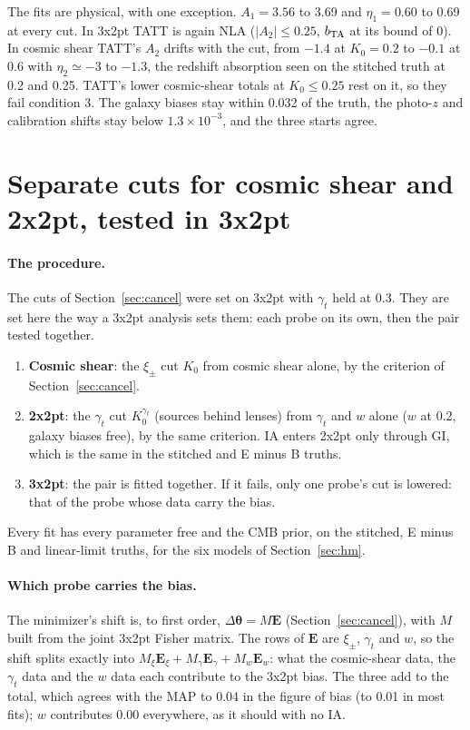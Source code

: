 \documentclass[11pt]{article}
\newcommand{\bvec}[1]{\boldsymbol{#1}}
\begin{document}
The fits are physical, with one exception. $A_1 = 3.56$ to 3.69 and $\eta_1
= 0.60$ to 0.69 at every cut. In 3x2pt TATT is again NLA ($|A_2| \le 0.25$,
$b_{\rm TA}$ at its bound of 0). In cosmic shear TATT's $A_2$ drifts with
the cut, from $-1.4$ at $K_0 = 0.2$ to $-0.1$ at 0.6 with $\eta_2 \simeq -3$
to $-1.3$, the redshift absorption seen on the stitched truth at 0.2 and
0.25. TATT's lower cosmic-shear totals at $K_0 \le 0.25$ rest on it, so they
fail condition 3. The galaxy biases stay within 0.032 of the truth, the
photo-$z$ and calibration shifts stay below $1.3\times10^{-3}$, and the three
starts agree.

\section{Separate cuts for cosmic shear and 2x2pt, tested in 3x2pt}
\label{sec:sepcuts}

\paragraph{The procedure.}
The cuts of Section~\ref{sec:cancel} were set on 3x2pt with $\gamma_t$ held
at 0.3. They are set here the way a 3x2pt analysis sets them: each probe on
its own, then the pair tested together.
\begin{enumerate}
  \item \textbf{Cosmic shear}: the $\xi_\pm$ cut $K_0$ from cosmic shear
    alone, by the criterion of Section~\ref{sec:cancel}.
  \item \textbf{2x2pt}: the $\gamma_t$ cut $K_0^{\gamma_t}$ (sources behind
    lenses) from $\gamma_t$ and $w$ alone ($w$ at 0.2, galaxy biases free),
    by the same criterion. IA enters 2x2pt only through GI, which is the
    same in the stitched and E minus B truths.
  \item \textbf{3x2pt}: the pair is fitted together. If it fails, only one
    probe's cut is lowered: that of the probe whose data carry the bias.
\end{enumerate}
Every fit has every parameter free and the CMB prior, on the stitched, E
minus B and linear-limit truths, for the six models of Section~\ref{sec:hm}.

\paragraph{Which probe carries the bias.}
The minimizer's shift is, to first order, $\Delta\bvec\theta = M\bvec E$
(Section~\ref{sec:cancel}), with $M$ built from the joint 3x2pt Fisher
matrix. The rows of $\bvec E$ are $\xi_\pm$, $\gamma_t$ and $w$, so the
shift splits exactly into $M_\xi\bvec E_\xi + M_{\gamma}\bvec E_{\gamma} +
M_w\bvec E_w$: what the cosmic-shear data, the $\gamma_t$ data and the $w$
data each contribute to the 3x2pt bias. The three add to the total, which
agrees with the MAP to 0.04 in the figure of bias (to 0.01 in most fits); $w$ contributes 0.00 everywhere, as it should with no IA.
\end{document}
